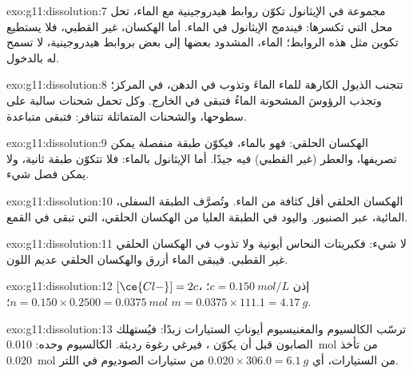 \begin{solution}{exo:g11:dissolution:7}
مجموعة  في الإيثانول تكوّن روابط هيدروجينية مع  الماء،
تحل محل التي تكسرها: فيندمج الإيثانول في الماء. أما الهكسان، غير القطبي،
فلا يستطيع تكوين مثل هذه الروابط؛  الماء، المشدود بعضها إلى بعض بروابط
هيدروجينية، لا تسمح له بالدخول.
\end{solution}

\begin{solution}{exo:g11:dissolution:8}
تتجنب الذيول الكارهة للماء الماءَ وتذوب في الدهن، في
المركز؛ وتجذب الرؤوسَ المشحونة الماءُ فتبقى في الخارج. وكل
 تحمل شحنات سالبة على سطوحها، والشحنات المتماثلة
تتنافر: فتبقى متباعدة.
\end{solution}

\begin{solution}{exo:g11:dissolution:9}
الهكسان الحلقي: فهو  بالماء، فيكوّن طبقة منفصلة
يمكن تصريفها، والعطر (غير القطبي)  فيه جيدًا.
أما الإيثانول  بالماء: فلا تتكوّن طبقة ثانية، ولا يمكن فصل
شيء.
\end{solution}

\begin{solution}{exo:g11:dissolution:10}
الهكسان الحلقي أقل كثافة من الماء. وتُصرَّف الطبقة السفلى، المائية،
عبر الصنبور. واليود في الطبقة العليا من الهكسان الحلقي، التي
تبقى في القمع.
\end{solution}

\begin{solution}{exo:g11:dissolution:11}
لا شيء: فكبريتات النحاس أيونية ولا تذوب في الهكسان الحلقي غير
القطبي. فيبقى الماء أزرق والهكسان الحلقي عديم اللون.
\end{solution}

\begin{solution}{exo:g11:dissolution:12}
$[\ce{Cl-}] = 2c$، إذن $c = \qty{0.150}{mol/L}$؛
$n = 0.150 \times 0.2500 = \qty{0.0375}{mol}$؛
$m = 0.0375 \times 111.1 = \qty{4.17}{g}$.
\end{solution}

\begin{solution}{exo:g11:dissolution:13}
ترسّب  الكالسيوم والمغنيسيوم أيوناتِ الستيارات زبدًا:
فيُستهلك الصابون قبل أن يكوّن ، فيرغي رغوة رديئة.
الكالسيوم وحده: \qty{0.010}{mol} من  تأخذ
\qty{0.020}{mol} من الستيارات، أي $0.020 \times 306.0 =
\qty{6.1}{g}$ من ستيارات الصوديوم في اللتر.
\end{solution}

